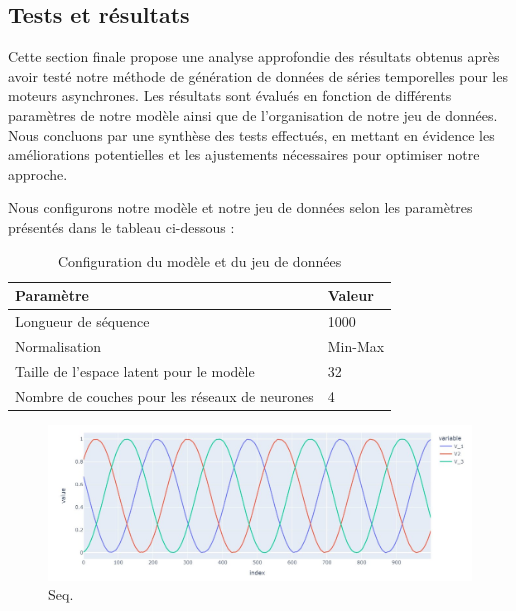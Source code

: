 \subsection{Tests et résultats}
Cette section finale propose une analyse approfondie des résultats obtenus
après avoir testé notre méthode de génération de données de séries temporelles
pour les moteurs asynchrones. Les résultats sont évalués en fonction de
différents paramètres de notre modèle ainsi que de l'organisation de notre jeu
de données. Nous concluons par une synthèse des tests effectués, en mettant en
évidence les améliorations potentielles et les ajustements nécessaires pour
optimiser notre approche.

Nous configurons notre modèle et notre jeu de données selon les paramètres
présentés dans le tableau ci-dessous :

\begin{table}[h!]
  \centering
  \begin{tabular}{|l|l|}
    \hline
    \textbf{Paramètre}                             & \textbf{Valeur} \\ \hline
    Longueur de séquence                           & 1000            \\ \hline
    Normalisation                                  & Min-Max         \\ \hline
    Taille de l'espace latent pour le modèle       & 32              \\ \hline
    Nombre de couches pour les réseaux de neurones & 4               \\ \hline
  \end{tabular}
  \caption{Configuration du modèle et du jeu de données}
\end{table}

\begin{figure}[hbt!]
  \centering
  \includegraphics[width=14cm]{images_pfe/real_1000.jpg}
  \caption{Seq.}
  \label{fig:real_1000}
\end{figure}
\FloatBarrier
\medskip

